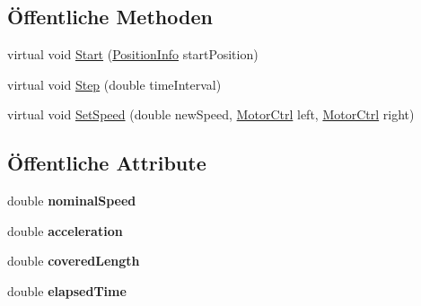 \subsection*{Öffentliche Methoden}
\begin{DoxyCompactItemize}
\item 
virtual void \hyperlink{class_robot_ctrl_1_1_track_a91c0b372e1c332ae1aa18368df116633}{Start} (\hyperlink{struct_robot_ctrl_1_1_position_info}{PositionInfo} startPosition)
\item 
virtual void \hyperlink{class_robot_ctrl_1_1_track_a82386b9a49faa6a31d9706f39238f21b}{Step} (double timeInterval)
\item 
virtual void \hyperlink{class_robot_ctrl_1_1_track_a9abc3ccf4bf1d9db8d461f2cb4b4b0d3}{SetSpeed} (double newSpeed, \hyperlink{class_robot_ctrl_1_1_motor_ctrl}{MotorCtrl} left, \hyperlink{class_robot_ctrl_1_1_motor_ctrl}{MotorCtrl} right)
\end{DoxyCompactItemize}
\subsection*{Öffentliche Attribute}
\begin{DoxyCompactItemize}
\item 
\hypertarget{class_robot_ctrl_1_1_track_a7d996b14578c6059e6868e2210e1d582}{
double {\bfseries nominalSpeed}}
\label{class_robot_ctrl_1_1_track_a7d996b14578c6059e6868e2210e1d582}

\item 
\hypertarget{class_robot_ctrl_1_1_track_abf40e28208ac9861b7f75042fcb68d20}{
double {\bfseries acceleration}}
\label{class_robot_ctrl_1_1_track_abf40e28208ac9861b7f75042fcb68d20}

\item 
\hypertarget{class_robot_ctrl_1_1_track_a590aa4c79e81feedcc5116a874d88e4d}{
double {\bfseries coveredLength}}
\label{class_robot_ctrl_1_1_track_a590aa4c79e81feedcc5116a874d88e4d}

\item 
\hypertarget{class_robot_ctrl_1_1_track_a17436774d1af50ddffc88f505728f713}{
double {\bfseries elapsedTime}}
\label{class_robot_ctrl_1_1_track_a17436774d1af50ddffc88f505728f713}

\end{DoxyCompactItemize}
